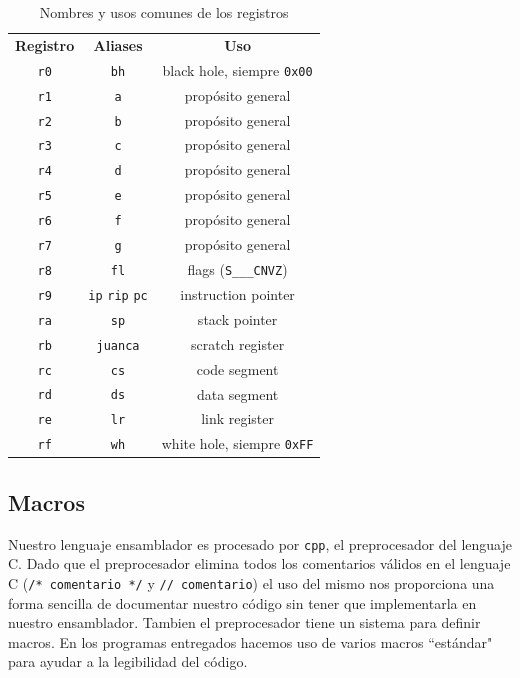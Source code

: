 \documentclass{article}
\begin{document}
\begin{table}[h]
    \centering
    \begin{tabular}{c|c|c}
        \textbf{Registro} & \textbf{Aliases} & \textbf{Uso} \\
        \texttt{r0}       & \texttt{bh}      & black hole, siempre \texttt{0x00} \\
        \texttt{r1}       & \texttt{a}       & propósito general \\
        \texttt{r2}       & \texttt{b}       & propósito general \\
        \texttt{r3}       & \texttt{c}       & propósito general \\
        \texttt{r4}       & \texttt{d}       & propósito general \\
        \texttt{r5}       & \texttt{e}       & propósito general \\
        \texttt{r6}       & \texttt{f}       & propósito general \\
        \texttt{r7}       & \texttt{g}       & propósito general \\
        \texttt{r8}       & \texttt{fl}      & flags (\texttt{S\_\_\_CNVZ}) \\
        \texttt{r9}       & \texttt{ip} \texttt{rip} \texttt{pc} 
                                             & instruction pointer \\
        \texttt{ra}       & \texttt{sp}      & stack pointer \\
        \texttt{rb}       & \texttt{juanca}  & scratch register \\
        \texttt{rc}       & \texttt{cs}      & code segment \\
        \texttt{rd}       & \texttt{ds}      & data segment \\
        \texttt{re}       & \texttt{lr}      & link register \\
        \texttt{rf}       & \texttt{wh}      & white hole, siempre \texttt{0xFF} \\
    \end{tabular}
    \caption{Nombres y usos comunes de los registros}
\end{table}

\subsection{Macros}
Nuestro lenguaje ensamblador es procesado por \texttt{cpp}, el preprocesador del lenguaje C. Dado que el preprocesador elimina todos los comentarios válidos en el lenguaje C (\texttt{/* comentario */} y \texttt{// comentario}) el uso del mismo nos proporciona una forma sencilla de documentar nuestro código sin tener que implementarla en nuestro ensamblador. Tambien el preprocesador tiene un sistema para definir macros. En los programas entregados hacemos uso de varios macros ``estándar" para ayudar a la legibilidad del código. 
\end{document}
